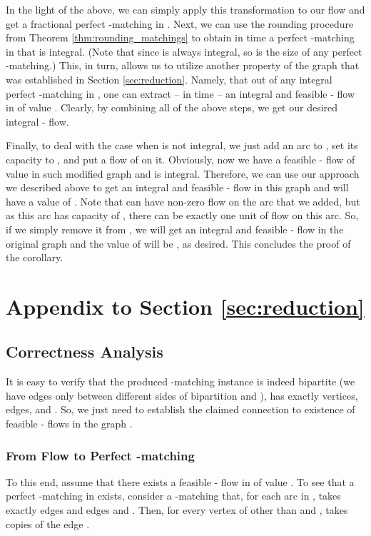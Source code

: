 \documentclass[11pt, letterpaper]{article}
\begin{document}
In the light of the above, we can simply apply this transformation to our flow  and get a fractional perfect -matching  in . Next, we can use the rounding procedure from Theorem \ref{thm:rounding_matchings} to obtain in  time a perfect -matching  in  that is integral. (Note that since  is always integral, so is the size of any perfect -matching.) This, in turn, allows us to utilize another property of the graph  that was established in Section \ref{sec:reduction}. Namely, that out of any integral perfect -matching in , one can extract -- in  time -- an integral and feasible - flow  in  of value . Clearly, by combining all of the above steps, we get our desired integral - flow. 

Finally, to deal with the case when  is not integral, we just add an arc  to , set its capacity to , and put a flow of  on it. Obviously, now we have a feasible - flow of value  in such modified graph  and  is integral. Therefore, we can use our approach we described above to get an integral and feasible - flow  in this graph and  will have a value of . Note that  can have non-zero flow on the arc  that we added, but as this arc has capacity of , there can be exactly one unit of flow on this arc. So, if we simply remove it from , we will get an integral and feasible - flow in the original graph  and the value of  will be , as desired. This concludes the proof of the corollary. \section{Appendix to Section \ref{sec:reduction}}\label{app:reduction}

\subsection{Correctness Analysis}

It is easy to verify that the produced -matching instance is indeed bipartite (we have edges only between different sides of bipartition  and ), has exactly  vertices,  edges, and . So, we just need to establish the claimed connection to existence of feasible - flows in the graph . 


\subsubsection*{From Flow  to Perfect -matching }

To this end, assume that there exists a feasible - flow  in  of value . To see that a perfect -matching in  exists, consider a -matching  that, for each arc  in , takes exactly  edges  and  edges  and . Then, for every vertex  of  other than  and ,  takes  copies of the edge . 
\end{document}
